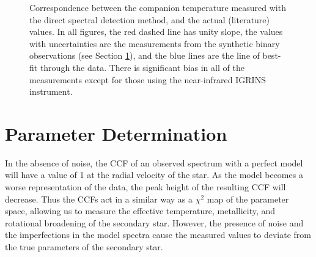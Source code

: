 \documentclass{emulateapj}
\begin{document}
\begin{figure}
{         }
         \caption{Correspondence between the companion temperature measured with the direct spectral detection method, and the actual (literature) values. In all figures, the red dashed line has unity slope, the values with uncertainties are the measurements from the synthetic binary observations (see Section \ref{subsec:systematics}), and the blue lines are the line of best-fit through the data. There is significant bias in all of the measurements except for those using the near-infrared IGRINS instrument.}
         \label{fig:error}
\end{figure}

\section{Parameter Determination}
\label{subsec:systematics}



In the absence of noise, the CCF of an observed spectrum with a perfect model will have a value of 1 at the radial velocity of the star. As the model becomes a worse representation of the data, the peak height of the resulting CCF will decrease. Thus the CCFs act in a similar way as a $\chi^2$ map of the parameter space, allowing us to measure the effective temperature, metallicity, and rotational broadening of the secondary star. However, the presence of noise and the imperfections in the model spectra cause the measured values to deviate from the true parameters of the secondary star. 
\end{document}
